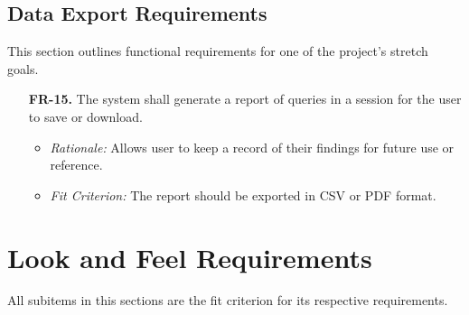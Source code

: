 \documentclass[12pt]{article}
\begin{document}
\subsection{Data Export Requirements}
This section outlines functional requirements for one of the project's stretch
goals.
\begin{enumerate}
  \item[\textbf{FR-15.}] The system shall generate a report of queries in a
  session for the user to save or download.
  \begin{itemize}
    \item \textit{Rationale:} Allows user to keep a record of their findings for
    future use or reference.
    \item \textit{Fit Criterion:} The report should be exported in CSV or PDF
    format.
  \end{itemize}
\end{enumerate}

\section{Look and Feel Requirements}
All subitems in this sections are the fit criterion for its respective
requirements. 
\end{document}
